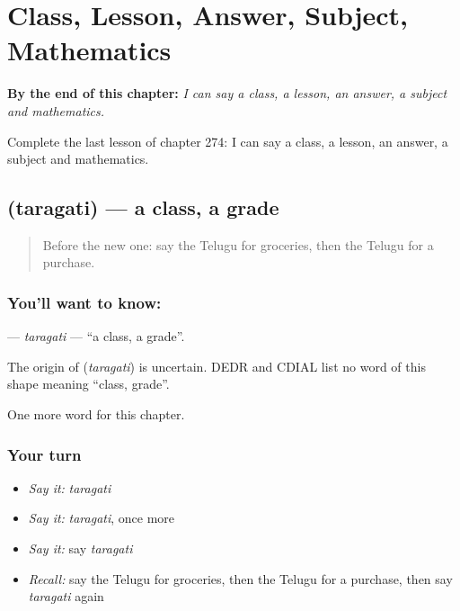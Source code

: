 
\chapter{Class, Lesson, Answer, Subject, Mathematics}
\label{ch:te-class-lesson-answer-subject-mathematics}

\begin{chapteropening}
\textbf{By the end of this chapter:} \emph{I can say a class, a lesson, an answer, a subject and mathematics.}

Complete the last lesson of chapter 274: I can say a class, a lesson, an answer, a subject and mathematics.
\end{chapteropening}

\section[\texorpdfstring{\te{తరగతి} (taragati)}{తరగతి (taragati)}]{ (taragati) — a class, a grade}

\label{lesson:TE-C274-taragati}



\begin{quote}
Before the new one: say the Telugu for groceries, then the Telugu for a purchase.
\end{quote}

\subsection*{You'll want to know: }
\textbf{} — \emph{taragati} — \textquotedblleft{}a class, a grade\textquotedblright{}.

\begin{cousinweb}
The origin of \textbf{} (\emph{taragati}) is uncertain. DEDR and CDIAL list no word of this shape meaning \textquotedblleft{}class, grade\textquotedblright{}.
\end{cousinweb}

\begin{grammarlens}[title={What you've built}]
One more word for this chapter.
\end{grammarlens}

\subsection*{Your turn}
\begin{itemize}
\raggedright
  \item \emph{Say it:} \emph{taragati}
  \item \emph{Say it:} \emph{taragati}, once more
  \item \emph{Say it:} say \emph{taragati}
  \item \emph{Recall:} say the Telugu for groceries, then the Telugu for a purchase, then say \emph{taragati} again
\end{itemize}

